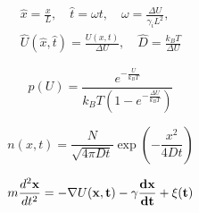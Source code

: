 \begin{gather}
    \hat{x} = \frac{x}{L}, \quad
    \hat{t} = \omega t, \quad
    \omega = \frac{\Delta U}{\gamma_i L^2}, \\
    \hat{U}(\hat{x},\hat{t}) = \frac{U(x,t)}{\Delta U}, \quad
    \hat{D} = \frac{k_B T}{\Delta U}
\end{gather}

\begin{equation}
    p(U) = \frac{e^{-\frac{U}{k_B T}}}{k_B T (1-e^{-\frac{\Delta U}{k_B T}})} 
\end{equation}

\begin{equation}
    n(x,t) = \frac{N}{\sqrt{4 \pi D t}} \exp\left(-\frac{x^2}{4Dt}\right)
\end{equation}


\begin{equation}
    m \frac{d^2 \bf{x}}{d t^2} = - \nabla U(\bf{x}, t) - \gamma \frac{d\bf{x}}{dt} + \xi (t)
\end{equation}
